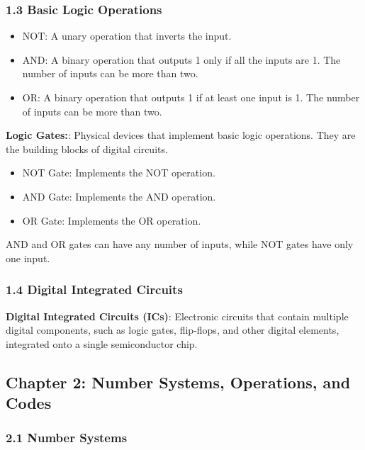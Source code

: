 \documentclass[
  a4paper,
]{article}
\providecommand{\tightlist}{%
  \setlength{\itemsep}{0pt}\setlength{\parskip}{0pt}}
\begin{document}
\subsubsection{1.3 Basic Logic Operations}\label{basic-logic-operations}

\begin{itemize}
\tightlist
\item
  NOT: A unary operation that inverts the input.
\item
  AND: A binary operation that outputs 1 only if all the inputs are 1.
  The number of inputs can be more than two.
\item
  OR: A binary operation that outputs 1 if at least one input is 1. The
  number of inputs can be more than two.
\end{itemize}

\textbf{Logic Gates:}: Physical devices that implement basic logic
operations. They are the building blocks of digital circuits.

\begin{itemize}
\tightlist
\item
  NOT Gate: Implements the NOT operation.
\item
  AND Gate: Implements the AND operation.
\item
  OR Gate: Implements the OR operation.
\end{itemize}

AND and OR gates can have any number of inputs, while NOT gates have
only one input.

\subsubsection{1.4 Digital Integrated
Circuits}\label{digital-integrated-circuits}

\textbf{Digital Integrated Circuits (ICs)}: Electronic circuits that
contain multiple digital components, such as logic gates, flip-flops,
and other digital elements, integrated onto a single semiconductor chip.

\subsection{Chapter 2: Number Systems, Operations, and
Codes}\label{chapter-2-number-systems-operations-and-codes}

\subsubsection{2.1 Number Systems}\label{number-systems}
\end{document}
